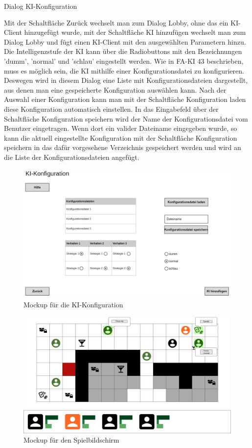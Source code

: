 Dialog \glqq{}KI-Konfiguration\grqq{}

Mit der Schaltfläche \glqq{}Zurück\grqq{} wechselt man zum Dialog \glqq{}Lobby\grqq{}, ohne das ein KI-Client hinzugefügt wurde, mit der Schaltfläche \glqq{}KI hinzufügen\grqq{} wechselt man zum Dialog \glqq{}Lobby\grqq{} und fügt einen KI-Client mit den ausgewählten Parametern hinzu.
Die Intelligenzstufe der KI kann über die Radiobuttons mit den Bezeichnungen 'dumm', 'normal' und 'schlau' eingestellt werden.
Wie in FA-KI 43 beschrieben, muss es möglich sein, die KI mithilfe einer Konfigurationsdatei zu konfigurieren. Deswegen wird in diesem Dialog eine Liste mit Konfigurationsdateien dargestellt, aus denen man eine gespeicherte Konfiguration auswählen kann. Nach der Auswahl einer Konfiguration kann man mit der Schaltfläche \glqq{}Konfiguration laden\grqq{} diese Konfiguration automatisch einstellen.
In das Eingabefeld über der Schaltfläche \glqq{}Konfiguration speichern\grqq{} wird der Name der Konfigurationsdatei vom Benutzer eingetragen. Wenn dort ein valider Dateiname eingegeben wurde, so kann die aktuell eingestellte Konfiguration mit der Schaltfläche \glqq{}Konfiguration speichern\grqq{} in das dafür vorgesehene Verzeichnis gespeichert werden und wird an die Liste der Konfigurationsdateien angefügt.

\begin{figure}
  \centering
  \includegraphics[width=\textwidth]{Meilenstein03/KI-Konfiguration_Mockup.png}
  \caption{Mockup für die KI-Konfiguration}
\end{figure}


\begin{figure}
  \centering
  \includegraphics[width=\textwidth]{Meilenstein03/Game_Mockup.png}
  \caption{Mockup für den Spielbildschirm}
\end{figure}
